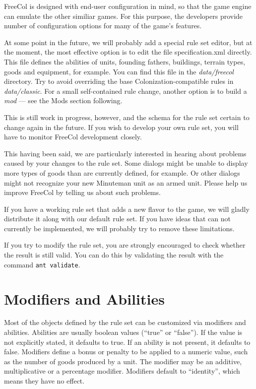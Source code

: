 \documentclass[12pt]{book}
\begin{document}
FreeCol is designed with end-user configuration in mind, so that the game
engine can emulate the other similiar games. For this purpose, the developers
provide number of configuration options for many of the game's features.

At some point in the future, we will probably add a special rule set
editor, but at the moment, the most effective option is to edit the file
specification.xml directly. This file defines the abilities of units,
founding fathers, buildings, terrain types, goods and equipment, for
example. You can find this file in the \textit{data/freecol}
directory. Try to avoid overriding the base Colonization-compatible
rules in \textit{data/classic}. For a small self-contained rule
change, another option is to build a \emph{mod} --- see the Mods
section following.

This is still work in progress, however, and the schema for the rule
set certain to change again in the future. If you wish to develop your
own rule set, you will have to monitor FreeCol development closely.

This having been said, we are particularly interested in hearing about
problems caused by your changes to the rule set. Some dialogs might be
unable to display more types of goods than are currently defined, for
example. Or other dialogs might not recognize your new Minuteman unit
as an armed unit. Please help us improve FreeCol by telling us about
such problems.

If you have a working rule set that adds a new flavor to the game, we
will gladly distribute it along with our default rule set. If you have
ideas that can not currently be implemented, we will probably try to
remove these limitations.

If you try to modify the rule set, you are strongly encouraged to
check whether the result is still valid. You can do this by validating
the result with the command \verb$ant validate$.


\hypertarget{Modifiers and Abilities}{\section{Modifiers and Abilities}}

Most of the objects defined by the rule set can be customized via
modifiers and abilities. Abilities are usually boolean values
(``true'' or ``false''). If the value is not explicitly stated, it
defaults to true. If an ability is not present, it defaults to
false. Modifiers define a bonus or penalty to be applied to a numeric
value, such as the number of goods produced by a unit. The modifier
may be an additive, multiplicative or a percentage modifier. Modifiers
default to ``identity'', which means they have no effect.
\end{document}
